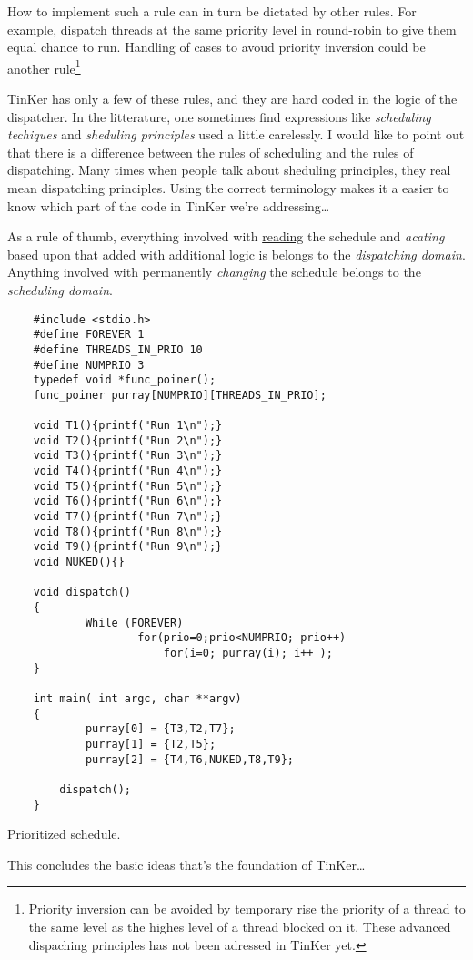 How to implement such a rule can in turn be dictated by other rules. For example, dispatch threads at the same priority level in round-robin to give them equal chance to run. Handling of cases to avoud priority inversion could be another rule\footnote{Priority inversion can be avoided by temporary rise the priority of a thread to the same level as the highes level of a thread blocked on it. These advanced dispaching principles has not been adressed in TinKer yet.} 

TinKer has only a few of these rules, and they are hard coded in the logic of the dispatcher. In the litterature, one sometimes find expressions like \textit{scheduling techiques} and \textit{sheduling principles} used a little carelessly. I would like to point out that there is a difference between the rules of scheduling and the rules of dispatching. Many times when people talk about sheduling principles, they real mean dispatching principles. Using the correct terminology makes it a easier to know which part of the code in TinKer we're addressing\ldots

As a rule of thumb, everything involved with \underline{reading} the schedule and \textit{acating} based upon that added with additional logic is belongs to the \textit{dispatching domain}. Anything involved with permanently \textit{changing} the schedule belongs to the \textit{scheduling domain}.


	\begin{table}[!hbp]
	\begin{verbatim}
	#include <stdio.h>
	#define FOREVER 1
	#define THREADS_IN_PRIO 10
	#define NUMPRIO 3
	typedef void *func_poiner();
	func_poiner purray[NUMPRIO][THREADS_IN_PRIO];

	void T1(){printf("Run 1\n");}
	void T2(){printf("Run 2\n");}
	void T3(){printf("Run 3\n");}
	void T4(){printf("Run 4\n");}
	void T5(){printf("Run 5\n");}
	void T6(){printf("Run 6\n");}
	void T7(){printf("Run 7\n");}
	void T8(){printf("Run 8\n");}
	void T9(){printf("Run 9\n");}
	void NUKED(){}

	void dispatch()
	{
	        While (FOREVER)
	                for(prio=0;prio<NUMPRIO; prio++)
	                	for(i=0; purray(i); i++ );
	}

	int main( int argc, char **argv)
	{
	        purray[0] = {T3,T2,T7};
	        purray[1] = {T2,T5};
	        purray[2] = {T4,T6,NUKED,T8,T9};

		dispatch();
	}
	\end{verbatim}
	\caption{Prioritized schedule.\label{schedued2}}
	\end{table}
	This concludes the basic ideas that's the foundation of TinKer\ldots

